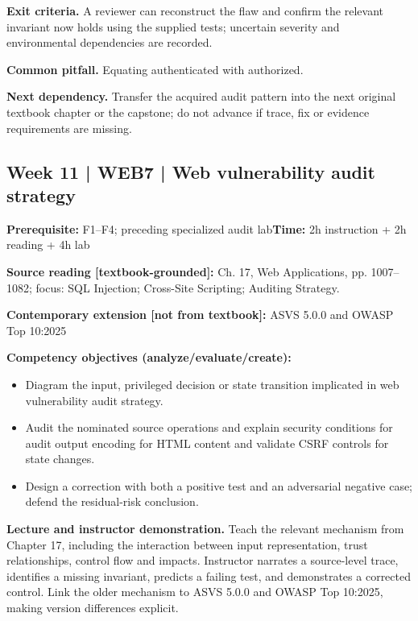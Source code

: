 \documentclass[10pt,letterpaper]{article}
\begin{document}
\textbf{Exit criteria.} A reviewer can reconstruct the flaw and confirm the relevant invariant now holds using the supplied tests; uncertain severity and environmental dependencies are recorded.

\textbf{Common pitfall.} Equating authenticated with authorized.

\textbf{Next dependency.} Transfer the acquired audit pattern into the next original textbook chapter or the capstone; do not advance if trace, fix or evidence requirements are missing.

\subsection{Week 11 | WEB7 | Web vulnerability audit strategy}
\textbf{Prerequisite:} F1--F4; preceding specialized audit lab\hfill\textbf{Time:} 2h instruction + 2h reading + 4h lab

\textbf{Source reading [textbook-grounded]:} Ch. 17, Web Applications, pp. 1007--1082; focus: SQL Injection; Cross-Site Scripting; Auditing Strategy.

\textbf{Contemporary extension [not from textbook]:} ASVS 5.0.0 and OWASP Top 10:2025

\textbf{Competency objectives (analyze/evaluate/create):}
\begin{itemize}[leftmargin=*,itemsep=2pt]
\item Diagram the input, privileged decision or state transition implicated in web vulnerability audit strategy.
\item Audit the nominated source operations and explain security conditions for audit output encoding for HTML content and validate CSRF controls for state changes.
\item Design a correction with both a positive test and an adversarial negative case; defend the residual-risk conclusion.
\end{itemize}
\textbf{Lecture and instructor demonstration.} Teach the relevant mechanism from Chapter 17, including the interaction between input representation, trust relationships, control flow and impacts. Instructor narrates a source-level trace, identifies a missing invariant, predicts a failing test, and demonstrates a corrected control. Link the older mechanism to ASVS 5.0.0 and OWASP Top 10:2025, making version differences explicit.
\end{document}
